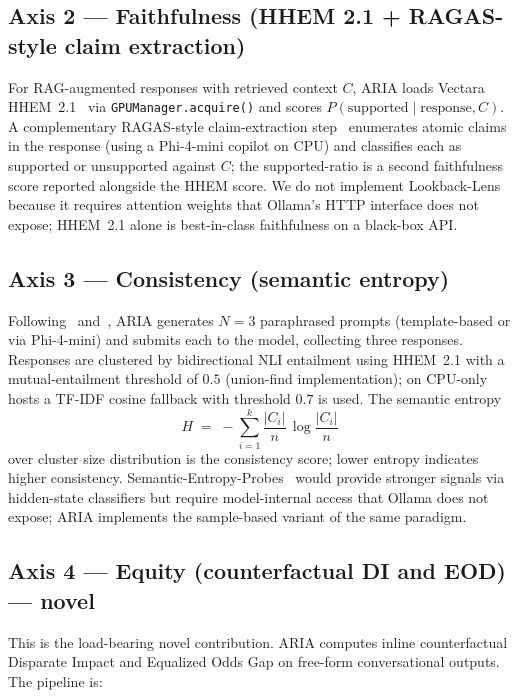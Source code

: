 \documentclass{article}
\begin{document}
\subsection{Axis 2 — Faithfulness (HHEM 2.1 + RAGAS-style claim extraction)}
\label{sec:axis-faithfulness}

For RAG-augmented responses with retrieved context $C$, ARIA loads
Vectara HHEM~2.1~\citep{vectara2024hhem} via \texttt{GPUManager.acquire()}
and scores $P(\text{supported} \mid \text{response}, C)$.
A complementary RAGAS-style claim-extraction step~\citep{es2023ragas}
enumerates atomic claims in the response (using a Phi-4-mini copilot on
CPU) and classifies each as supported or unsupported against $C$; the
supported-ratio is a second faithfulness score reported alongside the
HHEM score.
We do not implement Lookback-Lens~\citep{chuang2024lookback} because it
requires attention weights that Ollama's HTTP interface does not expose;
HHEM~2.1 alone is best-in-class faithfulness on a black-box API.

\subsection{Axis 3 — Consistency (semantic entropy)}
\label{sec:axis-consistency}

Following~\citet{kuhn2023semantic} and~\citet{farquhar2024nature}, ARIA
generates $N = 3$ paraphrased prompts (template-based or via Phi-4-mini)
and submits each to the model, collecting three responses.
Responses are clustered by bidirectional NLI entailment using HHEM~2.1
with a mutual-entailment threshold of $0.5$ (union-find implementation);
on CPU-only hosts a TF-IDF cosine fallback with threshold $0.7$ is used.
The semantic entropy
\[
  H \;=\; -\sum_{i=1}^{k} \frac{|C_i|}{n}\,\log\frac{|C_i|}{n}
\]
over cluster size distribution is the consistency score; lower entropy
indicates higher consistency.
Semantic-Entropy-Probes~\citep{kossen2024probes} would provide stronger
signals via hidden-state classifiers but require model-internal access
that Ollama does not expose; ARIA implements the sample-based variant of
the same paradigm.

\subsection{Axis 4 — Equity (counterfactual DI and EOD) — \texorpdfstring{\textbf{novel}}{novel}}
\label{sec:axis-equity}

This is the load-bearing novel contribution.
ARIA computes inline counterfactual Disparate Impact and Equalized Odds
Gap on free-form conversational outputs.
The pipeline is:
\end{document}
